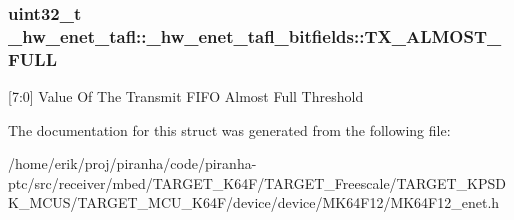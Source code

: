 \subsubsection[{\texorpdfstring{T\+X\+\_\+\+A\+L\+M\+O\+S\+T\+\_\+\+F\+U\+LL}{TX_ALMOST_FULL}}]{\setlength{\rightskip}{0pt plus 5cm}uint32\+\_\+t \+\_\+hw\+\_\+enet\+\_\+tafl\+::\+\_\+hw\+\_\+enet\+\_\+tafl\+\_\+bitfields\+::\+T\+X\+\_\+\+A\+L\+M\+O\+S\+T\+\_\+\+F\+U\+LL}\hypertarget{struct__hw__enet__tafl_1_1__hw__enet__tafl__bitfields_a88b8e157a76866a770ee9192aa10da69}{}\label{struct__hw__enet__tafl_1_1__hw__enet__tafl__bitfields_a88b8e157a76866a770ee9192aa10da69}
\mbox{[}7\+:0\mbox{]} Value Of The Transmit F\+I\+FO Almost Full Threshold 

The documentation for this struct was generated from the following file\+:\begin{DoxyCompactItemize}
\item 
/home/erik/proj/piranha/code/piranha-\/ptc/src/receiver/mbed/\+T\+A\+R\+G\+E\+T\+\_\+\+K64\+F/\+T\+A\+R\+G\+E\+T\+\_\+\+Freescale/\+T\+A\+R\+G\+E\+T\+\_\+\+K\+P\+S\+D\+K\+\_\+\+M\+C\+U\+S/\+T\+A\+R\+G\+E\+T\+\_\+\+M\+C\+U\+\_\+\+K64\+F/device/device/\+M\+K64\+F12/M\+K64\+F12\+\_\+enet.\+h\end{DoxyCompactItemize}
